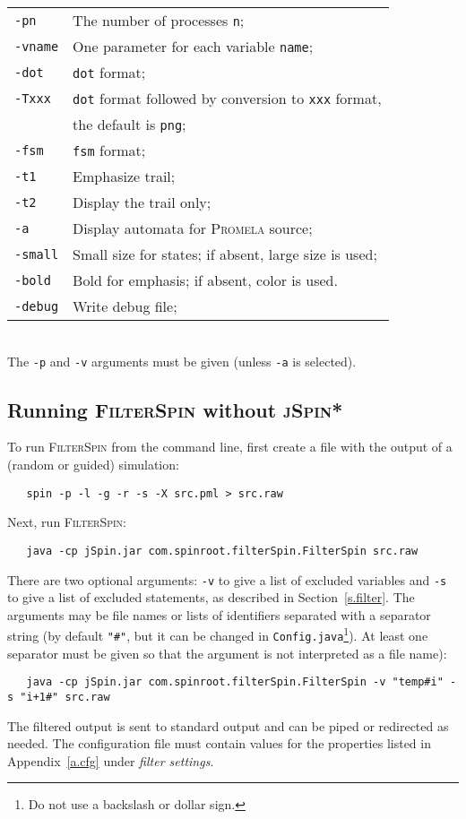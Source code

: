 \documentclass[11pt]{article}
\newcommand{\prm}{\textsc{Promela}}
\newcommand{\js}{\textsc{jSpin}}
\newcommand{\fil}{\textsc{FilterSpin}}
\newcommand{\dtf}{\texttt{dot}}
\newcommand{\fsm}{\texttt{fsm}}
\newcommand{\p}[1]{\texttt{#1}}
\begin{document}
\hspace*{1cm}
\begin{tabular}{ll}
\p{-pn} & The number of processes \p{n};\\
\p{-vname} & One parameter for each variable \p{name};\\
\p{-dot} & \dtf{} format;\\
\p{-Txxx} & \dtf{} format followed by conversion to \p{xxx} format,\\
& the default is \p{png};\\
\p{-fsm} & \fsm{} format;\\
\p{-t1} & Emphasize trail;\\
\p{-t2} & Display the trail only;\\
\p{-a} & Display automata for \prm{} source;\\
\p{-small} & Small size for states; if absent, large size is used;\\
\p{-bold} & Bold for emphasis; if absent, color is used.\\
\p{-debug} & Write debug file;\\
\end{tabular}\\
\noindent{}The \p{-p} and \p{-v} arguments must be given (unless \p{-a} is selected).

\subsection{Running \fil{} without \js{}*}
To run \fil{} from the command line, first create a file with the output
of a (random or guided) simulation:
\begin{verbatim}
   spin -p -l -g -r -s -X src.pml > src.raw
\end{verbatim}
Next, run \fil{}:
\begin{verbatim}
   java -cp jSpin.jar com.spinroot.filterSpin.FilterSpin src.raw
\end{verbatim}
There are two optional arguments: \p{-v} to give a list of excluded
variables and \p{-s} to give a list of excluded statements, as described
in Section~\ref{s.filter}. The arguments may be file names or lists of
identifiers separated with a separator string (by default \p{"\#"}, but
it can be changed in \p{Config.java}\footnote{Do not use a backslash or
dollar sign.}). At least one separator must be given so that the
argument is not interpreted as a file name):
\begin{verbatim}
   java -cp jSpin.jar com.spinroot.filterSpin.FilterSpin -v "temp#i" -s "i+1#" src.raw
\end{verbatim}
The filtered output is sent to standard output and can be piped or
redirected as needed. The configuration file must contain values for the
properties listed in Appendix~\ref{a.cfg} under \emph{filter settings}.
\end{document}
